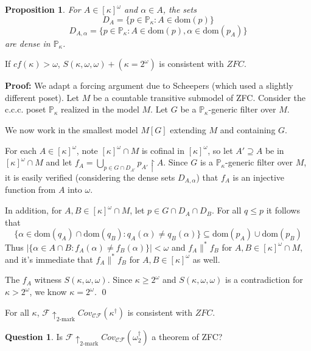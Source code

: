 \documentclass{beamer}
\theoremstyle{theorem}
\newtheorem{proposition}[theorem]{Proposition}
\theoremstyle{definition}
\newtheorem{question}[theorem]{Question}
\newcommand{\kmarkwin}[1]{\uparrow_{#1\text{-mark}}}
\newcommand{\oneptlind}[1]{#1^\dagger}
\newcommand{\mengame}[1]{Cov_{\pl C\pl F}(#1)}
\newcommand{\rest}{\restriction}
\newcommand{\<}{\langle}
\renewcommand{\>}{\rangle}
\newcommand{\al}[1]{{#1}^*}
\newcommand{\po}{\mathbb{P}}
\newcommand{\pok}{\po_\kappa}
\newcommand{\alcomp}{\al\parallel}
\newcommand{\dom}{\textrm{dom}}
\newcommand{\pl}[1]{\mathscr{#1}}
\begin{document}
\begin{frame}
  \begin{proposition}
    For $A\in[\kappa]^\omega$ and $\alpha\in A$, the sets 
      \[
        D_A = \{p\in\pok: A\in\dom(p)\}
      \]
      \[
        D_{A,\alpha} = \{p\in\pok: A\in\dom(p), \alpha\in\dom(p_A)\}
      \]
    are dense in $\pok$.
  \end{proposition}

  \begin{theorem}
    If $cf(\kappa)>\omega$, $S(\kappa,\omega,\omega)+(\kappa=2^\omega)$ is consistent with $ZFC$.
  \end{theorem}\pause

  \textbf{Proof:}
    We adapt a forcing argument due to Scheepers (which used a slightly different poset). Let $M$ be a countable transitive submodel of ZFC. Consider the c.c.c. poset $\pok$ realized in the model $M$. Let $G$ be a $\pok$-generic filter over $M$.
\end{frame}
\begin{frame}
    We now work in the smallest model $M[G]$ extending $M$ and containing $G$.\vspace{6pt}

    For each $A\in [\kappa]^\omega$, note $[\kappa]^\omega\cap M$ is cofinal in $[\kappa]^\omega$, so let $A'\supseteq A$ be in $[\kappa]^\omega\cap M$ and let $f_A=\bigcup_{p\in G\cap D_{A'}}p_{A'}\rest A$. Since $G$ is a $\pok$-generic filter over $M$, it is easily verified (considering the dense sets $D_{A,\alpha}$) that $f_A$ is an injective function from $A$ into $\omega$.\pause\vspace{6pt}

    In addition, for $A,B\in [\kappa]^\omega\cap M$, let $p\in G\cap D_A\cap D_B$. For all $q\leq p$ it follows that 
      \[
        \{\alpha\in \dom(q_A)\cap \dom(q_B): q_A(\alpha)\not= q_B(\alpha)\} \subseteq \dom(p_A)\cup\dom(p_B)
      \] 
    Thus $|\{\alpha\in A\cap B: f_A(\alpha)\not= f_B(\alpha)\}|<\omega$ and $f_A\alcomp f_B$ for $A,B\in [\kappa]^\omega\cap M$, and it's immediate that $f_A\alcomp f_B$ for $A,B\in[\kappa]^\omega$ as well.\pause\vspace{6pt}

    The $f_A$ witness $S(\kappa,\omega,\omega)$. Since $\kappa\geq 2^\omega$ and $S(\kappa,\omega,\omega)$ is a contradiction for $\kappa>2^\omega$, we know $\kappa=2^\omega$. \qed
\end{frame}

\begin{frame}
  \begin{corollary}
    For all $\kappa$, $\pl F\kmarkwin{2}\mengame{\oneptlind{\kappa}}$ is consistent with $ZFC$.
  \end{corollary}

  \begin{question}
    Is $\pl F\kmarkwin{2}\mengame{\oneptlind{\omega_2}}$ a theorem of ZFC?
  \end{question}
\end{frame}
\end{document}
